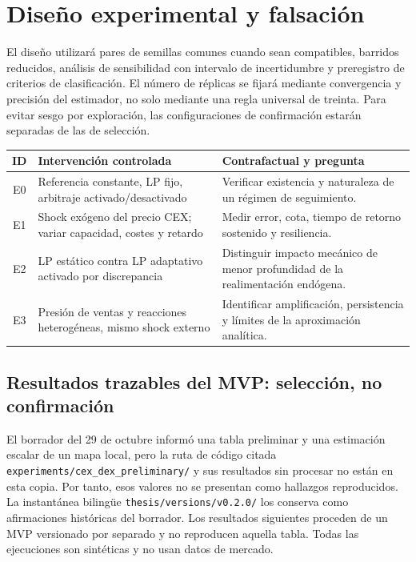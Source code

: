 \section{Diseño experimental y falsación}

El diseño utilizará pares de semillas comunes cuando sean compatibles, barridos
reducidos, análisis de sensibilidad con intervalo de incertidumbre y preregistro de
criterios de clasificación. El número de réplicas se fijará mediante convergencia y
precisión del estimador, no solo mediante una regla universal de treinta. Para evitar
sesgo por exploración, las configuraciones de confirmación estarán separadas de las
de selección.

\begin{table}[!ht]
\centering
\small
\begin{tabularx}{\textwidth}{@{}c p{4.2cm} X@{}}
\toprule
\textbf{ID} & \textbf{Intervención controlada} & \textbf{Contrafactual y pregunta} \\
\midrule
E0 & Referencia constante, LP fijo, arbitraje activado/desactivado & Verificar existencia
  y naturaleza de un régimen de seguimiento. \\
E1 & Shock exógeno del precio CEX; variar capacidad, costes y retardo & Medir error, cota,
  tiempo de retorno sostenido y resiliencia. \\
E2 & LP estático contra LP adaptativo activado por discrepancia & Distinguir impacto mecánico
  de menor profundidad de la realimentación endógena. \\
E3 & Presión de ventas y reacciones heterogéneas, mismo shock externo & Identificar
  amplificación, persistencia y límites de la aproximación analítica. \\
\bottomrule
\end{tabularx}
\end{table}

\subsection{Resultados trazables del MVP: selección, no confirmación}

El borrador del 29 de octubre informó una tabla preliminar y una estimación escalar de
un mapa local, pero la ruta de código citada
\texttt{experiments/cex\_dex\_preliminary/} y sus resultados sin procesar no están en
esta copia. Por tanto, esos valores no se presentan como hallazgos reproducidos. La
instantánea bilingüe \texttt{thesis/versions/v0.2.0/} los conserva como afirmaciones
históricas del borrador. Los resultados siguientes proceden de un MVP versionado por
separado y no reproducen aquella tabla. Todas las ejecuciones son sintéticas y no usan
datos de mercado.

